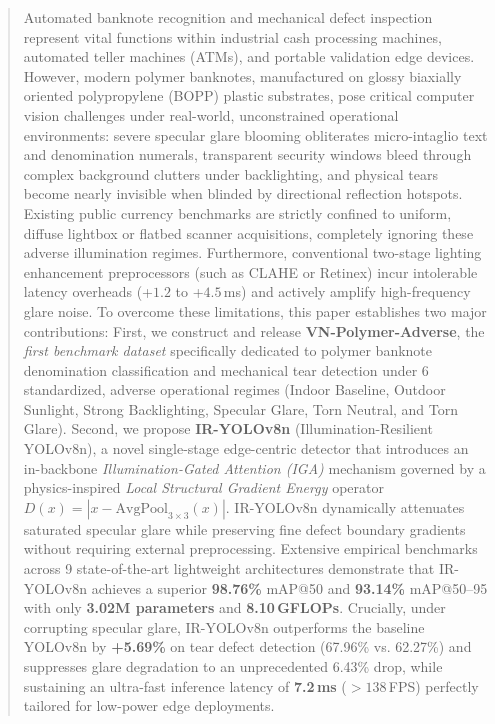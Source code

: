 \documentclass[twocolumn]{svjour3}
\begin{document}
\begin{abstract}
Automated banknote recognition and mechanical defect inspection represent vital functions within industrial cash processing machines, automated teller machines (ATMs), and portable validation edge devices. However, modern polymer banknotes, manufactured on glossy biaxially oriented polypropylene (BOPP) plastic substrates, pose critical computer vision challenges under real-world, unconstrained operational environments: severe specular glare blooming obliterates micro-intaglio text and denomination numerals, transparent security windows bleed through complex background clutters under backlighting, and physical tears become nearly invisible when blinded by directional reflection hotspots. Existing public currency benchmarks are strictly confined to uniform, diffuse lightbox or flatbed scanner acquisitions, completely ignoring these adverse illumination regimes. Furthermore, conventional two-stage lighting enhancement preprocessors (such as CLAHE or Retinex) incur intolerable latency overheads (+$1.2$ to +$4.5$\,ms) and actively amplify high-frequency glare noise. To overcome these limitations, this paper establishes two major contributions: First, we construct and release \textbf{VN-Polymer-Adverse}, the \textit{first benchmark dataset} specifically dedicated to polymer banknote denomination classification and mechanical tear detection under 6 standardized, adverse operational regimes (Indoor Baseline, Outdoor Sunlight, Strong Backlighting, Specular Glare, Torn Neutral, and Torn Glare). Second, we propose \textbf{IR-YOLOv8n} (Illumination-Resilient YOLOv8n), a novel single-stage edge-centric detector that introduces an in-backbone \textit{Illumination-Gated Attention (IGA)} mechanism governed by a physics-inspired \textit{Local Structural Gradient Energy} operator $D(x) = |x - \text{AvgPool}_{3\times 3}(x)|$. IR-YOLOv8n dynamically attenuates saturated specular glare while preserving fine defect boundary gradients without requiring external preprocessing. Extensive empirical benchmarks across 9 state-of-the-art lightweight architectures demonstrate that IR-YOLOv8n achieves a superior \textbf{98.76\%} mAP@50 and \textbf{93.14\%} mAP@50--95 with only \textbf{3.02M parameters} and \textbf{8.10\,GFLOPs}. Crucially, under corrupting specular glare, IR-YOLOv8n outperforms the baseline YOLOv8n by \textbf{+5.69\%} on tear defect detection (67.96\% vs. 62.27\%) and suppresses glare degradation to an unprecedented 6.43\% drop, while sustaining an ultra-fast inference latency of \textbf{7.2\,ms} ($>138$\,FPS) perfectly tailored for low-power edge deployments.
\end{abstract}
\end{document}
